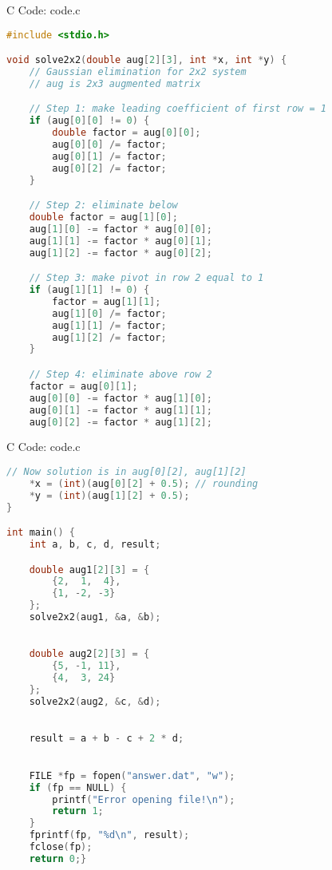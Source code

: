 \documentclass{beamer}
\numberwithin{equation}{section}
\theoremstyle{remark}
\begin{document}
\begin{frame}[fragile]{C Code: code.c}
\begin{lstlisting}[language=C]
#include <stdio.h>

void solve2x2(double aug[2][3], int *x, int *y) {
    // Gaussian elimination for 2x2 system
    // aug is 2x3 augmented matrix

    // Step 1: make leading coefficient of first row = 1
    if (aug[0][0] != 0) {
        double factor = aug[0][0];
        aug[0][0] /= factor;
        aug[0][1] /= factor;
        aug[0][2] /= factor;
    }

    // Step 2: eliminate below
    double factor = aug[1][0];
    aug[1][0] -= factor * aug[0][0];
    aug[1][1] -= factor * aug[0][1];
    aug[1][2] -= factor * aug[0][2];

    // Step 3: make pivot in row 2 equal to 1
    if (aug[1][1] != 0) {
        factor = aug[1][1];
        aug[1][0] /= factor;
        aug[1][1] /= factor;
        aug[1][2] /= factor;
    }

    // Step 4: eliminate above row 2
    factor = aug[0][1];
    aug[0][0] -= factor * aug[1][0];
    aug[0][1] -= factor * aug[1][1];
    aug[0][2] -= factor * aug[1][2];
\end{lstlisting}
\end{frame}

\begin{frame}[fragile]{C Code: code.c}
\begin{lstlisting}[language=C]
    // Now solution is in aug[0][2], aug[1][2]
    *x = (int)(aug[0][2] + 0.5); // rounding
    *y = (int)(aug[1][2] + 0.5);
}

int main() {
    int a, b, c, d, result;

    double aug1[2][3] = {
        {2,  1,  4},
        {1, -2, -3}
    };
    solve2x2(aug1, &a, &b);

    
    double aug2[2][3] = {
        {5, -1, 11},
        {4,  3, 24}
    };
    solve2x2(aug2, &c, &d);

    
    result = a + b - c + 2 * d;

  
    FILE *fp = fopen("answer.dat", "w");
    if (fp == NULL) {
        printf("Error opening file!\n");
        return 1;
    }
    fprintf(fp, "%d\n", result);
    fclose(fp);
    return 0;}
\end{lstlisting}
\end{frame}
\end{document}
